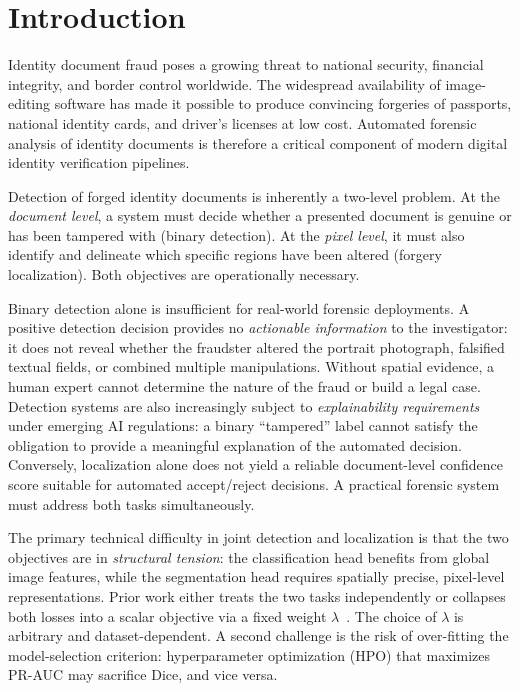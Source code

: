 \documentclass[final,5p,times,twocolumn,number]{elsarticle}
\begin{document}


\section{Introduction}
\label{sec:intro}

Identity document fraud poses a growing threat to national security, financial
integrity, and border control worldwide. The widespread availability of
image-editing software has made it possible to produce convincing forgeries of
passports, national identity cards, and driver's licenses at low cost.
Automated forensic analysis of identity documents
is therefore a critical component of modern digital identity verification
pipelines.

Detection of forged identity documents is inherently a two-level problem. At the
\emph{document level}, a system must decide whether a presented document is
genuine or has been tampered with (binary detection). At the \emph{pixel level},
it must also identify and delineate which specific regions have been altered
(forgery localization). Both objectives are operationally necessary.

Binary detection alone is insufficient for real-world forensic deployments.
A positive detection decision provides no \emph{actionable information} to the
investigator: it does not reveal whether the fraudster altered the portrait
photograph, falsified textual fields, or combined multiple manipulations. Without
spatial evidence, a human expert cannot determine the nature of the fraud or
build a legal case. Detection systems are also increasingly subject to
\emph{explainability requirements} under emerging AI regulations: a binary
``tampered'' label cannot satisfy the obligation
to provide a meaningful explanation of the automated decision. Conversely,
localization alone does not yield a reliable document-level confidence score
suitable for automated accept/reject decisions. A practical forensic system must
address both tasks simultaneously.

The primary technical difficulty in joint detection and localization is that the
two objectives are in \emph{structural tension}: the classification head
benefits from global image features, while the segmentation head requires
spatially precise, pixel-level representations. Prior work either treats the
two tasks independently \citep{trufor2023} or collapses both losses into a
scalar objective via a fixed weight $\lambda$~\citep{kendall2018multi}. The choice of $\lambda$ is arbitrary and dataset-dependent.
A second challenge is the risk of over-fitting the model-selection criterion:
hyperparameter optimization (HPO) that maximizes PR-AUC may sacrifice Dice, and vice versa.
\end{document}
